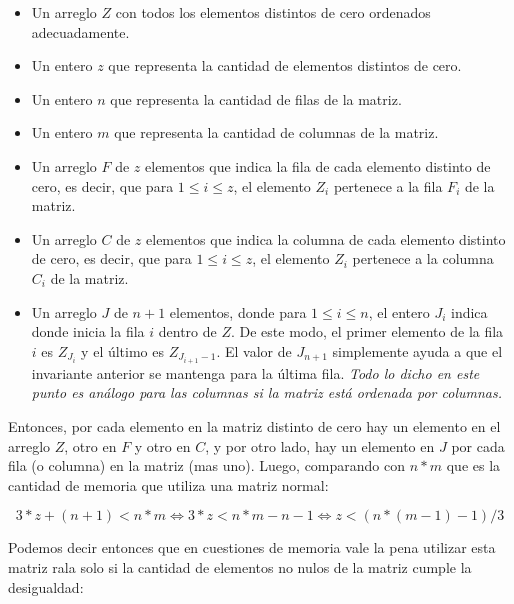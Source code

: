 \begin{itemize}

  \item Un arreglo $Z$ con todos los elementos distintos de cero ordenados
adecuadamente.

  \item Un entero $z$ que representa la cantidad de elementos distintos de cero.

  \item Un entero $n$ que representa la cantidad de filas de la matriz.

  \item Un entero $m$ que representa la cantidad de columnas de la matriz.

  \item Un arreglo $F$ de $z$ elementos que indica la fila de cada elemento
distinto de cero, es decir, que para $1 \leq i \leq z$, el elemento $Z_i$
pertenece a la fila $F_i$ de la matriz.

  \item Un arreglo $C$ de $z$ elementos que indica la columna de cada elemento
distinto de cero, es decir, que para $1 \leq i \leq z$, el elemento $Z_i$
pertenece a la columna $C_i$ de la matriz.

  \item Un arreglo $J$ de $n + 1$ elementos, donde para $1 \leq i \leq n$, el
entero $J_i$ indica donde inicia la fila $i$ dentro de $Z$. De este modo, el
primer elemento de la fila $i$ es $Z_{J_i}$ y el último es $Z_{J_{i + 1} - 1}$.
El valor de $J_{n + 1}$ simplemente ayuda a que el invariante anterior se
mantenga para la última fila. \textit{Todo lo dicho en este punto es análogo
para las columnas si la matriz está ordenada por columnas.}

\end{itemize}

Entonces, por cada elemento en la matriz distinto de cero hay un elemento en el
arreglo $Z$, otro en $F$ y otro en $C$, y por otro lado, hay un elemento en $J$
por cada fila (o columna) en la matriz (mas uno). Luego, comparando con $n * m$
que es la cantidad de memoria que utiliza una matriz normal:

\[
3 * z + (n + 1) <  n * m \Leftrightarrow
3 * z <  n * m - n - 1  \Leftrightarrow
z <  (n * (m - 1) - 1) / 3
\]

\noindent Podemos decir entonces que en cuestiones de memoria vale la pena
utilizar esta matriz rala solo si la cantidad de elementos no nulos de la
matriz cumple la desigualdad:

